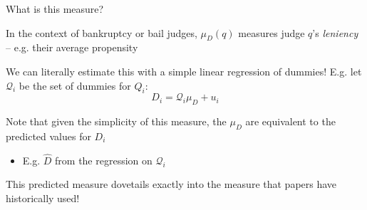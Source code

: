 \documentclass[notes,11pt, aspectratio=169]{beamer}
\newenvironment{wideitemize}{\itemize\addtolength{\itemsep}{10pt}}{\enditemize}
\begin{document}
\begin{frame}{What is this measure? }
  \begin{wideitemize}
  \item In the context of bankruptcy or bail judges, $\mu_{D}(q)$
    measures judge $q$'s \emph{leniency} -- e.g. their average
    propensity
  \item We can literally estimate this with a simple linear regression of dummies! E.g. let $\mathcal{Q}_{i}$ be the set of dummies for $Q_{i}$:
    \begin{equation*}
      D_{i} = \mathcal{Q}_{i}\mu_{D} + u_{i}
    \end{equation*}
  \item Note that given the simplicity of this measure, the $\mu_{D}$ are equivalent to the predicted values for $D_{i}$
    \begin{itemize}
    \item E.g. $\hat{D}$ from the regression on $\mathcal{Q}_{i}$
    \end{itemize}
  \item This predicted measure dovetails exactly into the measure that
    papers have historically used!
  \end{wideitemize}
\end{frame}
\end{document}
